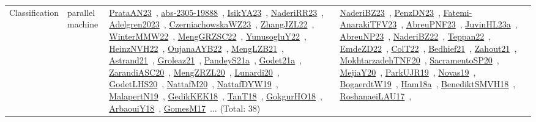 {\begin{longtable}{lp{3cm}>{\raggedright\arraybackslash}p{6cm}>{\raggedright\arraybackslash}p{6cm}>{\raggedright\arraybackslash}p{8cm}}
Classification & parallel machine & \href{../works/PrataAN23.pdf}{PrataAN23}~\cite{PrataAN23}, \href{../works/abs-2305-19888.pdf}{abs-2305-19888}~\cite{abs-2305-19888}, \href{../works/IsikYA23.pdf}{IsikYA23}~\cite{IsikYA23}, \href{../works/NaderiRR23.pdf}{NaderiRR23}~\cite{NaderiRR23}, \href{../works/Adelgren2023.pdf}{Adelgren2023}~\cite{Adelgren2023}, \href{../works/CzerniachowskaWZ23.pdf}{CzerniachowskaWZ23}~\cite{CzerniachowskaWZ23}, \href{../works/ZhangJZL22.pdf}{ZhangJZL22}~\cite{ZhangJZL22}, \href{../works/WinterMMW22.pdf}{WinterMMW22}~\cite{WinterMMW22}, \href{../works/MengGRZSC22.pdf}{MengGRZSC22}~\cite{MengGRZSC22}, \href{../works/YunusogluY22.pdf}{YunusogluY22}~\cite{YunusogluY22}, \href{../works/HeinzNVH22.pdf}{HeinzNVH22}~\cite{HeinzNVH22}, \href{../works/OujanaAYB22.pdf}{OujanaAYB22}~\cite{OujanaAYB22}, \href{../works/MengLZB21.pdf}{MengLZB21}~\cite{MengLZB21}, \href{../works/Astrand21.pdf}{Astrand21}~\cite{Astrand21}, \href{../works/Groleaz21.pdf}{Groleaz21}~\cite{Groleaz21}, \href{../works/PandeyS21a.pdf}{PandeyS21a}~\cite{PandeyS21a}, \href{../works/Godet21a.pdf}{Godet21a}~\cite{Godet21a}, \href{../works/ZarandiASC20.pdf}{ZarandiASC20}~\cite{ZarandiASC20}, \href{../works/MengZRZL20.pdf}{MengZRZL20}~\cite{MengZRZL20}, \href{../works/Lunardi20.pdf}{Lunardi20}~\cite{Lunardi20}, \href{../works/GodetLHS20.pdf}{GodetLHS20}~\cite{GodetLHS20}, \href{../works/NattafM20.pdf}{NattafM20}~\cite{NattafM20}, \href{../works/NattafDYW19.pdf}{NattafDYW19}~\cite{NattafDYW19}, \href{../works/MalapertN19.pdf}{MalapertN19}~\cite{MalapertN19}, \href{../works/GedikKEK18.pdf}{GedikKEK18}~\cite{GedikKEK18}, \href{../works/TanT18.pdf}{TanT18}~\cite{TanT18}, \href{../works/GokgurHO18.pdf}{GokgurHO18}~\cite{GokgurHO18}, \href{../works/ArbaouiY18.pdf}{ArbaouiY18}~\cite{ArbaouiY18}, \href{../works/GomesM17.pdf}{GomesM17}~\cite{GomesM17}... (Total: 38) & \href{../works/NaderiBZ23.pdf}{NaderiBZ23}~\cite{NaderiBZ23}, \href{../works/PenzDN23.pdf}{PenzDN23}~\cite{PenzDN23}, \href{../works/Fatemi-AnarakiTFV23.pdf}{Fatemi-AnarakiTFV23}~\cite{Fatemi-AnarakiTFV23}, \href{../works/AbreuPNF23.pdf}{AbreuPNF23}~\cite{AbreuPNF23}, \href{../works/JuvinHL23a.pdf}{JuvinHL23a}~\cite{JuvinHL23a}, \href{../works/AbreuNP23.pdf}{AbreuNP23}~\cite{AbreuNP23}, \href{../works/NaderiBZ22.pdf}{NaderiBZ22}~\cite{NaderiBZ22}, \href{../works/Teppan22.pdf}{Teppan22}~\cite{Teppan22}, \href{../works/EmdeZD22.pdf}{EmdeZD22}~\cite{EmdeZD22}, \href{../works/ColT22.pdf}{ColT22}~\cite{ColT22}, \href{../works/Bedhief21.pdf}{Bedhief21}~\cite{Bedhief21}, \href{../works/Zahout21.pdf}{Zahout21}~\cite{Zahout21}, \href{../works/MokhtarzadehTNF20.pdf}{MokhtarzadehTNF20}~\cite{MokhtarzadehTNF20}, \href{../works/SacramentoSP20.pdf}{SacramentoSP20}~\cite{SacramentoSP20}, \href{../works/MejiaY20.pdf}{MejiaY20}~\cite{MejiaY20}, \href{../works/ParkUJR19.pdf}{ParkUJR19}~\cite{ParkUJR19}, \href{../works/Novas19.pdf}{Novas19}~\cite{Novas19}, \href{../works/BogaerdtW19.pdf}{BogaerdtW19}~\cite{BogaerdtW19}, \href{../works/Ham18a.pdf}{Ham18a}~\cite{Ham18a}, \href{../works/BenediktSMVH18.pdf}{BenediktSMVH18}~\cite{BenediktSMVH18}, \href{../works/RoshanaeiLAU17.pdf}{RoshanaeiLAU17}~\cite{RoshanaeiLAU17}, 
\end{longtable}}
